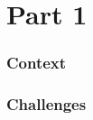 \section{Part 1} 


\begin{frame}
    \frametitle{Context}
\end{frame}

    
\begin{frame}    
    \frametitle{Challenges}
  
\end{frame}

 
